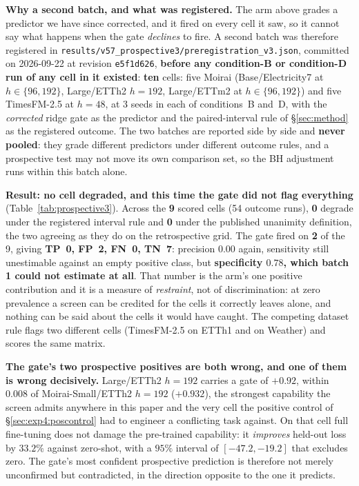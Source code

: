 \textbf{Why a second batch, and what was registered.}  The arm above grades a
predictor we have since corrected, and it fired on every cell it saw, so it
cannot say what happens when the gate \emph{declines} to fire.  A second batch was
therefore registered in
\texttt{results/v57\_prospective3/preregistration\_v3.json}, committed on
2026-09-22 at revision \texttt{e5f1d626}, \textbf{before any condition-B or
condition-D run of any cell in it existed}: \textbf{ten} cells: five Moirai
(Base/Electricity7 at $h{\in}\{96,192\}$, Large/ETTh2 $h{=}192$, Large/ETTm2 at
$h{\in}\{96,192\}$) and five TimesFM-2.5 at $h{=}48$, at 3 seeds in each of
conditions~B and~D, with the \emph{corrected} ridge gate as the predictor and the
paired-interval rule of \S\ref{sec:method} as the registered outcome.  The two
batches are reported side by side and \textbf{never pooled}: they grade different
predictors under different outcome rules, and a prospective test may not move its
own comparison set, so the BH adjustment runs within this batch alone.

\textbf{Result: no cell degraded, and this time the gate did not flag everything}
(Table~\ref{tab:prospective3}).  Across the \textbf{9} scored cells (54 outcome
runs), \textbf{0} degrade under the registered interval rule and \textbf{0} under
the published unanimity definition, the two agreeing as they do on the
retrospective grid.  The gate fired on \textbf{2} of the 9, giving \textbf{TP~0,
FP~2, FN~0, TN~7}: precision $0.00$ again, sensitivity still unestimable against
an empty positive class, but \textbf{specificity $0.78$, which batch 1 could not
estimate at all}.  That number is the arm's one positive contribution and it is a
measure of \emph{restraint}, not of discrimination: at zero prevalence a screen
can be credited for the cells it correctly leaves alone, and nothing can be said
about the cells it would have caught.  The competing dataset rule flags two
different cells (TimesFM-2.5 on ETTh1 and on Weather) and scores the same matrix.

\textbf{The gate's two prospective positives are both wrong, and one of them is
wrong decisively.}  Large/ETTh2 $h{=}192$ carries a gate of $+0.92$, within
$0.008$ of Moirai-Small/ETTh2 $h{=}192$ ($+0.932$), the strongest capability the
screen admits anywhere in this paper and the very cell the positive control of
\S\ref{sec:exp4:poscontrol} had to engineer a conflicting task against.  On that
cell full fine-tuning does not damage the pre-trained capability: it
\emph{improves} held-out loss by $33.2\%$ against zero-shot, with a $95\%$
interval of $[-47.2, -19.2]$ that excludes zero.  The gate's most confident
prospective prediction is therefore not merely unconfirmed but contradicted, in
the direction opposite to the one it predicts.

